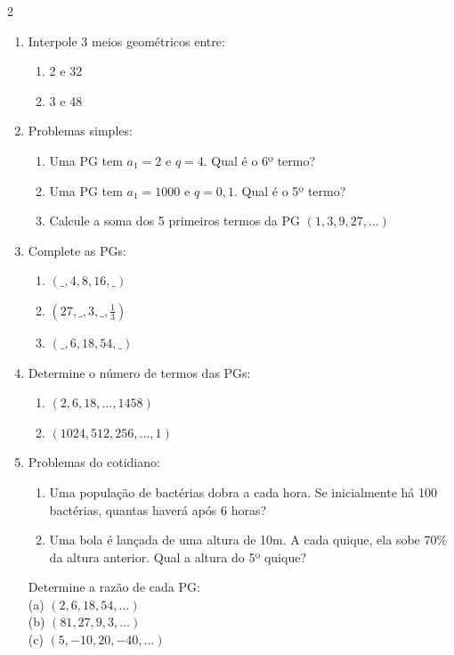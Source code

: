 \documentclass[11pt]{article}
\begin{document}
\begin{multicols}{2}
\begin{enumerate}[leftmargin=*]
\item Interpole 3 meios geométricos entre:
\begin{enumerate}[label=\alph*)]
\item 2 e 32
\item 3 e 48
\end{enumerate}

\item Problemas simples:
\begin{enumerate}[label=\alph*)]
\item Uma PG tem $a_1 = 2$ e $q = 4$. Qual é o 6º termo?
\item Uma PG tem $a_1 = 1000$ e $q = 0,1$. Qual é o 5º termo?
\item Calcule a soma dos 5 primeiros termos da PG $(1, 3, 9, 27, \ldots)$
\end{enumerate}

\item Complete as PGs:
\begin{enumerate}[label=\alph*)]
\item $( \_, 4, 8, 16, \_ )$
\item $(27, \_, 3, \_, \frac{1}{3})$
\item $( \_, 6, 18, 54, \_ )$
\end{enumerate}

\item Determine o número de termos das PGs:
\begin{enumerate}[label=\alph*)]
\item $(2, 6, 18, \ldots, 1458)$
\item $(1024, 512, 256, \ldots, 1)$
\end{enumerate}

\item Problemas do cotidiano:  
\begin{enumerate}[label=\alph*)] 
\item Uma população de bactérias dobra a cada hora. Se inicialmente há 100 bactérias, quantas haverá após 6 horas?
\item Uma bola é lançada de uma altura de 10m. A cada quique, ela sobe 70\% da altura anterior. Qual a altura do 5º quique?
\end{enumerate}

\vspace{10cm}
\hspace{2cm}{\LARGE{\textcolor{blue}{Gabarito}}}
\vspace{10pt}
\begin{tcolorbox}[colback=blue!8,colframe=blue!60!black,title=\textbf{Questão 1 },text width=0.85\columnwidth]
Determine a razão de cada PG: \\
(a) $(2,6,18,54,\ldots)$ \\ (b) $(81,27,9,3,\ldots)$ \\ (c) $(5,-10,20,-40,\ldots)$
\end{tcolorbox}


\end{enumerate}
\end{multicols}
\end{document}
